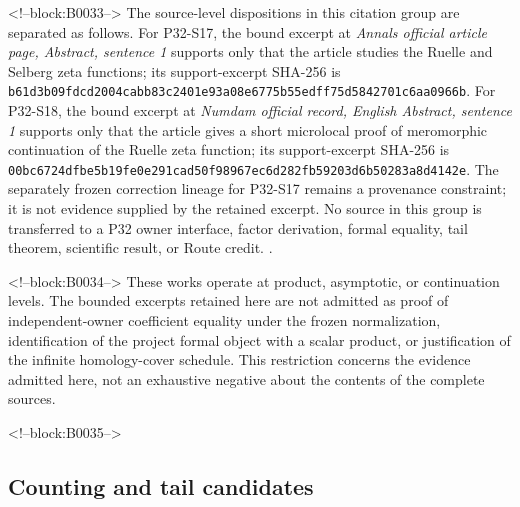 \documentclass[11pt]{article}
\begin{document}
<!--block:B0033-->
The source-level dispositions in this citation group are separated as follows.
For P32-S17, the bound excerpt at \emph{Annals official article page, Abstract, sentence 1} supports only that the article studies the Ruelle and Selberg zeta functions; its support-excerpt SHA-256 is \texttt{b61d3b09\allowbreak{}fdcd2004\allowbreak{}cabb83c2\allowbreak{}401e93a0\allowbreak{}8e6775b5\allowbreak{}5edff75d\allowbreak{}5842701c\allowbreak{}6aa0966b}.
For P32-S18, the bound excerpt at \emph{Numdam official record, English Abstract, sentence 1} supports only that the article gives a short microlocal proof of meromorphic continuation of the Ruelle zeta function; its support-excerpt SHA-256 is \texttt{00bc6724\allowbreak{}dfbe5b19\allowbreak{}fe0e291c\allowbreak{}ad50f989\allowbreak{}67ec6d28\allowbreak{}2fb59203\allowbreak{}d6b50283\allowbreak{}a8d4142e}.
The separately frozen correction lineage for P32-S17 remains a provenance constraint; it is not evidence supplied by the retained excerpt.
No source in this group is transferred to a P32 owner interface, factor derivation, formal equality, tail theorem, scientific result, or Route credit.
\citep{P32-S17,P32-S18}.

<!--block:B0034-->
These works operate at product, asymptotic, or continuation levels. The
bounded excerpts retained here are not admitted as proof of independent-owner
coefficient equality under the frozen normalization, identification of the
project formal object with a scalar product, or justification of the infinite
homology-cover schedule. This restriction concerns the evidence admitted here,
not an exhaustive negative about the contents of the complete sources.

<!--block:B0035-->
\hypertarget{24-counting-and-tail-candidates}{%
\subsection{Counting and tail
candidates}\label{24-counting-and-tail-candidates}}
\end{document}
